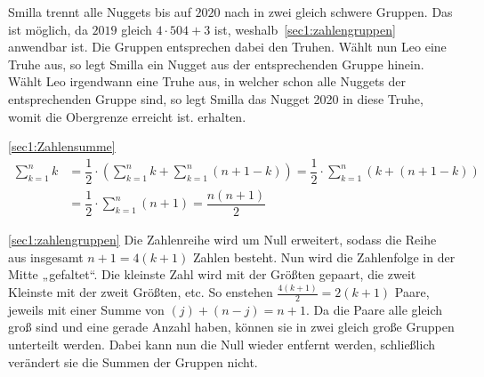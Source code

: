 \documentclass[10pt, a4paper]{amsart}
\makeatletter
\renewenvironment{proof}[1][\proofname]{\par
\pushQED{\qed}%
\normalfont \topsep6\p@\@plus6\p@\relax
\trivlist
\item\relax
{\bfseries#1}\hspace\labelsep\ignorespaces
}{%
\popQED\endtrivlist\@endpefalse
}
\newenvironment{proof_thm}[1]{
\begin{proof}[\proofname~(#1)]}{\end{proof}}
\makeatother
\begin{document}
\begin{proof}
  Smilla trennt alle Nuggets bis auf $2020$ nach in zwei gleich schwere Gruppen.
  Das ist möglich, da $2019$ gleich $4\cdot504 + 3$ ist,
  weshalb~\autoref{sec1:zahlengruppen} anwendbar ist. Die Gruppen entsprechen
  dabei den Truhen. Wählt nun Leo eine Truhe aus, so legt Smilla ein Nugget aus
  der entsprechenden Gruppe hinein. Wählt Leo irgendwann eine Truhe aus, in
  welcher schon alle Nuggets der entsprechenden Gruppe sind, so legt Smilla das
  Nugget 2020 in diese Truhe, womit die Obergrenze erreicht ist. erhalten.
\end{proof}
\begin{proof_thm}{\autoref{sec1:Zahlensumme}}
  \begin{align*}
    \sum^{n}_{k=1}k&=\dfrac{1}{2}\cdot\left( \sum^{n}_{k=1}k +
                     \sum^{n}_{k=1}(n+1-k)\right) = \dfrac{1}{2}\cdot\sum^{n}_{k=1}(k+(n+1-k))\\
                   &=\dfrac{1}{2}\cdot\sum^{n}_{k=1}(n+1) = \dfrac{n(n+1)}{2}
  \end{align*}
\end{proof_thm}
\begin{proof_thm}{\autoref{sec1:zahlengruppen}}
  Die Zahlenreihe wird um Null erweitert, sodass die Reihe aus insgesamt
  $n+1=4(k+1)$ Zahlen besteht. Nun wird die Zahlenfolge in der Mitte „gefaltet“.
  Die kleinste Zahl wird mit der Größten gepaart, die zweit Kleinste mit der
  zweit Größten, etc. So enstehen $\frac{4(k+1)}{2}=2(k+1)$ Paare, jeweils mit
  einer Summe von $(j)+(n-j) = n+1$. Da die Paare alle gleich groß sind und eine
  gerade Anzahl haben, können sie in zwei gleich große Gruppen unterteilt
  werden. Dabei kann nun die Null wieder entfernt werden, schließlich verändert
  sie die Summen der Gruppen nicht.
\end{proof_thm}
\end{document}
